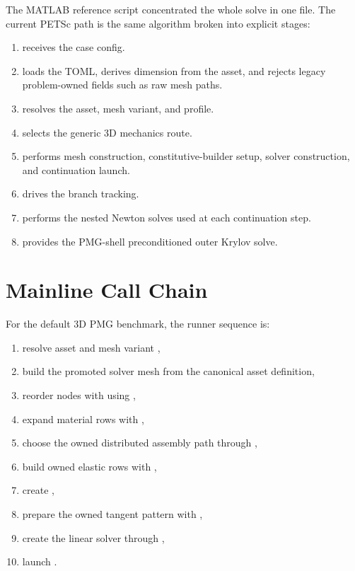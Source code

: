 The MATLAB reference script
 concentrated the whole solve in
one file. The current PETSc path is the same algorithm broken into explicit
stages:
\begin{enumerate}
\item {} receives the case config.
\item {} loads the TOML, derives dimension from the
asset, and rejects legacy problem-owned fields such as raw mesh paths.
\item {} resolves the asset, mesh variant,
and profile.
\item {} selects the generic 3D
mechanics route.
\item {}
performs mesh construction, constitutive-builder setup, solver construction,
and continuation launch.
\item {} drives
the branch tracking.
\item {} performs the nested
Newton solves used at each continuation step.
\item {} provides the PMG-shell
preconditioned outer Krylov solve.
\end{enumerate}

\section{Mainline Call Chain}

For the default 3D PMG benchmark, the runner sequence is:
\begin{enumerate}
\item resolve asset  and mesh variant
,
\item build the promoted solver mesh from the canonical asset definition,
\item reorder nodes with  using
,
\item expand material rows with ,
\item choose the owned distributed assembly path through
,
\item build owned elastic rows with
,
\item create ,
\item prepare the owned tangent pattern with
,
\item create the linear solver through ,
\item launch .
\end{enumerate}

